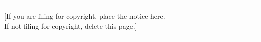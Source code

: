 \noindent
\newcommand\tab[1][1cm]{\hspace*{#1}}
\vspace{4pt}
\hrule
\vspace{4pt}
\tab[2cm]
\small
[If you are filing for copyright, place the notice here.\\
\tab If not filing for copyright, delete this page.]

\vspace{4pt}
\hrule
\vspace{4pt}

